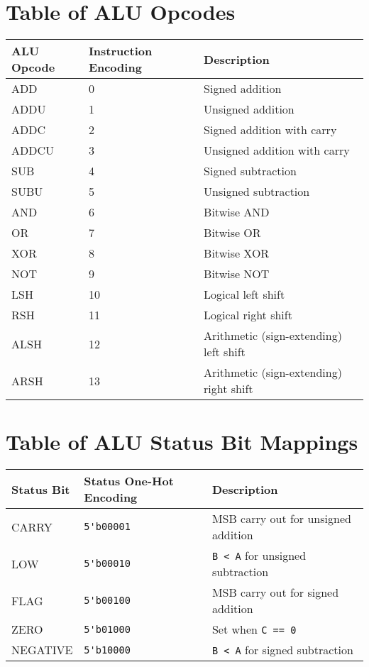 \documentclass[conference]{IEEEtran}
\begin{document}
\section{Table of ALU Opcodes}
\begin{center}
\begin{tabular}{ | P{5em} | P{5em} | P{12em} | } 
\hline
\textbf{ALU Opcode} & \textbf{Instruction Encoding} & \textbf{Description} \\
\hline
ADD & 0 & Signed addition \\
\hline
ADDU & 1 & Unsigned addition \\
\hline
ADDC & 2 & Signed addition with carry \\
\hline
ADDCU & 3 & Unsigned addition with carry \\
\hline
SUB & 4 & Signed subtraction \\
\hline
SUBU & 5 & Unsigned subtraction \\
\hline
AND & 6 & Bitwise AND \\
\hline
OR & 7 & Bitwise OR \\
\hline
XOR & 8 & Bitwise XOR \\
\hline
NOT & 9 & Bitwise NOT \\
\hline
LSH & 10 & Logical left shift \\
\hline
RSH & 11 & Logical right shift \\
\hline
ALSH & 12 & Arithmetic (sign-extending) left shift \\
\hline
ARSH & 13 & Arithmetic (sign-extending) right shift \\
\hline
\end{tabular}
\end{center}

\vspace{0.2in}
\section{Table of ALU Status Bit Mappings}
\begin{center}
\begin{tabular}{ | P{5em} | P{5em} | P{12em} | } 
\hline
\textbf{Status Bit} & \textbf{Status One-Hot Encoding} & \textbf{Description} \\
\hline
CARRY & \verb|5'b00001| & MSB carry out for unsigned addition \\
\hline
LOW & \verb|5'b00010| & \verb|B < A| for unsigned subtraction \\
\hline
FLAG & \verb|5'b00100| & MSB carry out for signed addition \\
\hline
ZERO & \verb|5'b01000| & Set when \verb|C == 0| \\
\hline
NEGATIVE & \verb|5'b10000| & \verb|B < A| for signed subtraction \\
\hline
\end{tabular}
\end{center}
\end{document}

